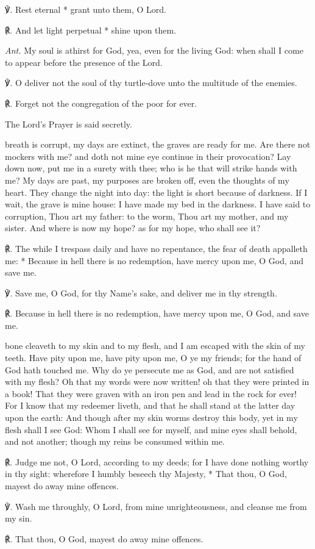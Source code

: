 ℣. Rest eternal * grant unto them, O Lord.\par
℟. And let light perpetual * shine upon them.\par\noindent
\textit{Ant.} My soul is athirst for God, yea, even for the living God: when shall I come to appear before the presence of the Lord.\par
\vspace{0.5\baselineskip}
℣. O deliver not the soul of thy turtle-dove unto the multitude of the enemies.\par
℟. Forget not the congregation of the poor for ever.\par

\begin{rubric}
The Lord's Prayer is said secretly.
\end{rubric}

 breath is corrupt, my days are extinct, the graves are ready for me. Are there not mockers with me? and doth not mine eye continue in their provocation? Lay down now, put me in a surety with thee; who is he that will strike hands with me? My days are past, my purposes are broken off, even the thoughts of my heart. They change the night into day: the light is short because of darkness. If I wait, the grave is mine house: I have made my bed in the darkness. I have said to corruption, Thou art my father: to the worm, Thou art my mother, and my sister. And where is now my hope? as for my hope, who shall see it?\par
℟. The while I trespass daily {\dag} and have no repentance, the fear of death appalleth me: * Because in hell there is no redemption, have mercy upon me, O God, and save me.\par
℣. Save me, O God, for thy Name's sake, and deliver me in thy strength.\par
℟. Because in hell there is no redemption, have mercy upon me, O God, and save me.

 bone cleaveth to my skin and to my flesh, and I am escaped with the skin of my teeth. Have pity upon me, have pity upon me, O ye my friends; for the hand of God hath touched me. Why do ye persecute me as God, and are not satisfied with my flesh? Oh that my words were now written! oh that they were printed in a book! That they were graven with an iron pen and lead in the rock for ever! For I know that my redeemer liveth, and that he shall stand at the latter day upon the earth: And though after my skin worms destroy this body, yet in my flesh shall I see God: Whom I shall see for myself, and mine eyes shall behold, and not another; though my reins be consumed within me.\par
℟. Judge me not, {\dag} O Lord, according to my deeds; for I have done nothing worthy in thy sight: wherefore I humbly beseech thy Majesty, * That thou, O God, mayest do away mine offences.\par
℣. Wash me throughly, O Lord, from mine unrighteousness, and cleanse me from my sin.\par
℟. That thou, O God, mayest do away mine offences.

